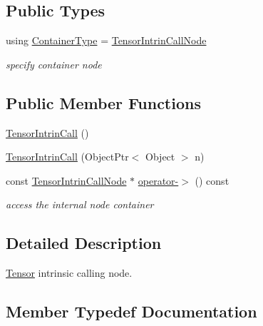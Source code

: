 \subsection*{Public Types}
\begin{DoxyCompactItemize}
\item 
using \hyperlink{classtvm_1_1te_1_1TensorIntrinCall_aeb26b74142670c1103d6a1ca431f212b}{Container\+Type} = \hyperlink{classtvm_1_1te_1_1TensorIntrinCallNode}{Tensor\+Intrin\+Call\+Node}
\begin{DoxyCompactList}\small\item\em specify container node \end{DoxyCompactList}\end{DoxyCompactItemize}
\subsection*{Public Member Functions}
\begin{DoxyCompactItemize}
\item 
\hyperlink{classtvm_1_1te_1_1TensorIntrinCall_a555f57d6ce8ee6317b3126d637d41cf0}{Tensor\+Intrin\+Call} ()
\item 
\hyperlink{classtvm_1_1te_1_1TensorIntrinCall_ab8ac0e6ea277c0c34e31521eb40cacef}{Tensor\+Intrin\+Call} (Object\+Ptr$<$ Object $>$ n)
\item 
const \hyperlink{classtvm_1_1te_1_1TensorIntrinCallNode}{Tensor\+Intrin\+Call\+Node} $\ast$ \hyperlink{classtvm_1_1te_1_1TensorIntrinCall_afe4181021d5583952c1d12087343800e}{operator-\/$>$} () const 
\begin{DoxyCompactList}\small\item\em access the internal node container \end{DoxyCompactList}\end{DoxyCompactItemize}


\subsection{Detailed Description}
\hyperlink{classtvm_1_1te_1_1Tensor}{Tensor} intrinsic calling node. 

\subsection{Member Typedef Documentation}

